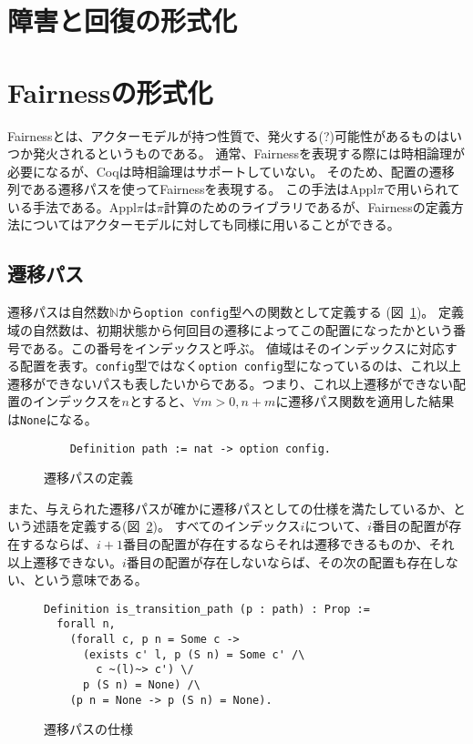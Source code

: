 \section{障害と回復の形式化}

\section{Fairnessの形式化}

Fairnessとは、アクターモデルが持つ性質で、発火する(?)可能性があるものはいつか発火されるというものである。
通常、Fairnessを表現する際には時相論理が必要になるが、Coqは時相論理はサポートしていない。
そのため、配置の遷移列である遷移パスを使ってFairnessを表現する。
この手法はAppl$\pi$\cite{}で用いられている手法である。Appl$\pi$は$\pi$計算のためのライブラリであるが、Fairnessの定義方法についてはアクターモデルに対しても同様に用いることができる。

\subsection{遷移パス}
遷移パスは自然数$\mathbb{N}$から\texttt{option config}型への関数として定義する (図~\ref{code:formalization:path})。
定義域の自然数は、初期状態から何回目の遷移によってこの配置になったかという番号である。この番号をインデックスと呼ぶ。
値域はそのインデックスに対応する配置を表す。\texttt{config}型ではなく\texttt{option config}型になっているのは、これ以上遷移ができないパスも表したいからである。つまり、これ以上遷移ができない配置のインデックスを$n$とすると、$\forall m > 0, n + m$に遷移パス関数を適用した結果は\texttt{None}になる。

\begin{figure}[tp]
  \begin{lstlisting}
    Definition path := nat -> option config.
  \end{lstlisting}
  \label{code:formalization:path}
  \caption{遷移パスの定義}
\end{figure}

また、与えられた遷移パスが確かに遷移パスとしての仕様を満たしているか、という述語を定義する(図~\ref{code:formalization:path-spec})。
すべてのインデックス$i$について、$i$番目の配置が存在するならば、$i+1$番目の配置が存在するならそれは遷移できるものか、それ以上遷移できない。$i$番目の配置が存在しないならば、その次の配置も存在しない、という意味である。

\begin{figure}[tp]
  \begin{lstlisting}
Definition is_transition_path (p : path) : Prop :=
  forall n,
    (forall c, p n = Some c ->
      (exists c' l, p (S n) = Some c' /\
        c ~(l)~> c') \/
      p (S n) = None) /\
    (p n = None -> p (S n) = None).
  \end{lstlisting}
  \label{code:formalization:path-spec}
  \caption{遷移パスの仕様}
\end{figure}

